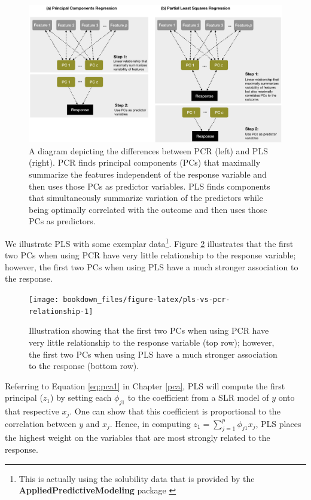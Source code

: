 \documentclass[]{krantz}
\begin{document}
\begin{figure}

{\centering \includegraphics[width=1\linewidth]{images/pls-vs-pcr} 

}

\caption{A diagram depicting the differences between PCR (left) and PLS (right). PCR finds principal components (PCs) that maximally summarize the features independent of the response variable and then uses those PCs as predictor variables. PLS finds components that simultaneously summarize variation of the predictors while being optimally correlated with the outcome and then uses those PCs as predictors.}\label{fig:pcr-vs-pls}
\end{figure}

We illustrate PLS with some exemplar data\footnote{This is actually using the solubility data that is provided by the \textbf{AppliedPredictiveModeling} package \citep{R-apm}}. Figure \ref{fig:pls-vs-pcr-relationship} illustrates that the first two PCs when using PCR have very little relationship to the response variable; however, the first two PCs when using PLS have a much stronger association to the response.

\begin{figure}

{\centering \texttt{[image: bookdown\_files/figure-latex/pls-vs-pcr-relationship-1]} 

}

\caption{Illustration showing that the first two PCs when using PCR have very little relationship to the response variable (top row); however, the first two PCs when using PLS have a much stronger association to the response (bottom row).}\label{fig:pls-vs-pcr-relationship}
\end{figure}

Referring to Equation \eqref{eq:pca1} in Chapter \ref{pca}, PLS will compute the first principal (\(z_1\)) by setting each \(\phi_{j1}\) to the coefficient from a SLR model of \(y\) onto that respective \(x_j\). One can show that this coefficient is proportional to the correlation between \(y\) and \(x_j\). Hence, in computing \(z_1 = \sum^p_{j=1} \phi_{j1}x_j\), PLS places the highest weight on the variables that are most strongly related to the response.
\end{document}
